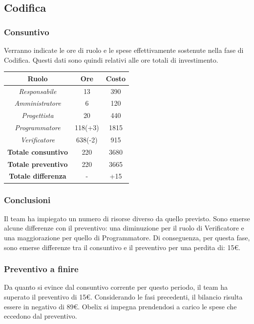 \subsection{Codifica}

\subsubsection{Consuntivo}

Verranno indicate le ore di ruolo e le spese effettivamente sostenute nella fase di Codifica. Questi dati sono quindi relativi alle ore totali di investimento.

\begin{center}
	\centering
	\begin{tabular}{|c|c|c|}
		\hline
		\textbf{Ruolo} & \textbf{Ore} & \textbf{Costo} \\
		\hline
		\emph{Responsabile}  & 13 & 390 \\
		\hline  \emph{Amministratore}  & 6 & 120 \\
		\hline  \emph{Progettista}  & 20 & 440 \\
		\hline  \emph{Programmatore}  & 118(+3) & 1815 \\
		\hline  \emph{Verificatore}  & 638(-2) & 915 \\
		\hline
		\textbf{Totale consuntivo} & 220 & 3680 \\
		\hline
		\textbf{Totale preventivo} & 220 &  3665\\
		\hline
		\textbf{Totale differenza} & - & +15 \\
		\hline
	\end{tabular}
	
\end{center}
\newpage
\subsubsection{Conclusioni}

Il team ha impiegato un numero di risorse diverso da quello previsto. Sono emerse alcune differenze con il preventivo: una diminuzione per il ruolo di Verificatore e una maggiorazione per quello di Programmatore. Di conseguenza, per questa fase, sono emerse differenze tra il consuntivo e il preventivo per una perdita di: 15€.

\subsubsection{Preventivo a finire}
Da quanto si evince dal consuntivo corrente per questo periodo, il team ha superato il preventivo
di 15€. Considerando le fasi precedenti, il bilancio risulta essere in negativo di 89€. Obelix si impegna prendendosi a carico le spese che eccedono dal preventivo. 


